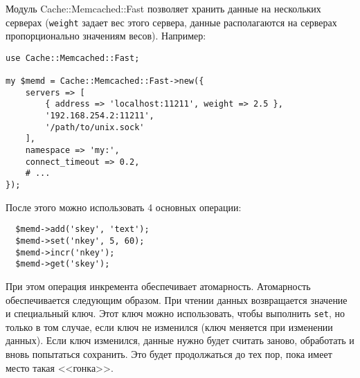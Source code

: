 Модуль Cache::Memcached::Fast позволяет хранить данные на нескольких серверах (\verb|weight| задает вес этого сервера, данные располагаются на серверах пропорционально значениям весов). Например:
\begin{verbatim}
use Cache::Memcached::Fast;

my $memd = Cache::Memcached::Fast->new({
    servers => [
        { address => 'localhost:11211', weight => 2.5 },
        '192.168.254.2:11211',
        '/path/to/unix.sock'
    ],
    namespace => 'my:',
    connect_timeout => 0.2,
    # ...
});
\end{verbatim}
После этого можно использовать 4 основных операции:
\begin{verbatim}
  $memd->add('skey', 'text');
  $memd->set('nkey', 5, 60);
  $memd->incr('nkey');
  $memd->get('skey');
\end{verbatim}
При этом операция инкремента обеспечивает атомарность. Атомарность обеспечивается следующим образом. При чтении данных возвращается значение и специальный ключ. Этот ключ можно использовать, чтобы выполнить \verb|set|, но только в том случае, если ключ не изменился (ключ меняется при изменении данных). Если ключ изменился, данные нужно будет считать заново, обработать и вновь попытаться сохранить. Это будет продолжаться до тех пор, пока имеет место такая <<гонка>>.
